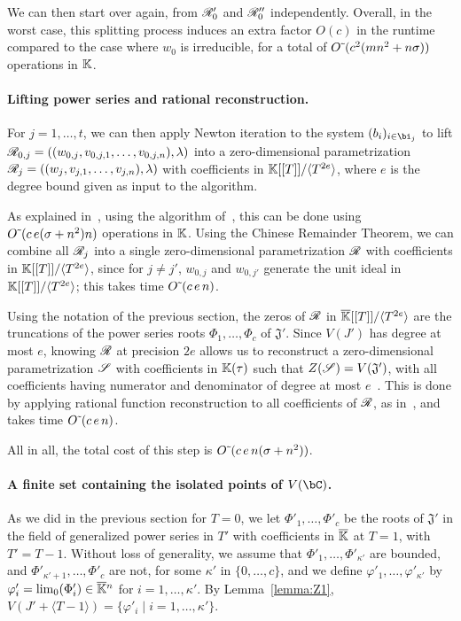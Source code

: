 \documentclass[12pt]{article}
\begin{document}
We can then start over again, from $\mathscr{R}'_0$ and $\mathscr{R}''_0$
independently. Overall, in the worst case, this splitting process
induces an extra factor $O(c)$ in the runtime compared to the case
where $w_0$ is irreducible, for a total of ${O}{\,\tilde{ }\,}( c^2 (mn^2 + n\sigma) )$
operations in $\mathbb{K}$.

\paragraph{Lifting power series and rational reconstruction.}
For $j=1,\dots,t$, we can then apply Newton iteration to the system
$(b_i)_{i \in \bi_j}$ to lift
$\mathscr{R}_{0,j}=((w_{0,j},v_{0,j,1},\dots,v_{0,j,n}),\lambda)$ into a
zero-dimensional parametrization
$\mathscr{R}_{j}=((w_{j},v_{j,1},\dots,v_{j,n}),\lambda)$ with coefficients
in $\mathbb{K}[[T]]/\langle T^{2e}\rangle$, where $e$ is the degree bound given
as input to the algorithm.

As explained in~\cite[Section~2.2]{SaSc16}, using the algorithm
of~\cite{GiLeSa01}, this can be done using ${O}{\,\tilde{ }\,}(c\,e (\sigma+n^2)n)$
operations in $\mathbb{K}$.  Using the Chinese Remainder Theorem, we can
combine all $\mathscr{R}_{j}$ into a single zero-dimensional parametrization
$\mathscr{R}$ with coefficients in $\mathbb{K}[[T]]/\langle T^{2e}\rangle$, since
for $j\ne j'$, $w_{0,j}$ and $w_{0,j'}$ generate the unit ideal in
$\mathbb{K}[[T]]/\langle T^{2e}\rangle$; this takes time 
${O}{\,\tilde{ }\,}(c\,e\,n)$.

Using the notation of the previous section, the zeros of $\mathscr{R}$ in
$\overline{\mathbb{K}}[[T]]/\langle T^{2e}\rangle$ are the truncations of the power
series roots $\Phi_1,\dots,\Phi_c$ of $\mathfrak{J}'$. Since $V(J')$ has
degree at most $e$, knowing $\mathscr{R}$ at precision $2e$ allows us to
reconstruct a zero-dimensional parametrization $\mathscr{S}$ with
coefficients in $\mathbb{K}(\tau)$ such that $Z(\mathscr{S})=V(\mathfrak{J}')$,
with all coefficients having numerator and denominator of degree at
most $e$~\cite[Theorem~1]{Schost03}.  This is done by applying
rational function reconstruction to all coefficients of $\mathscr{R}$, as
in~\cite{Schost03}, and takes time ${O}{\,\tilde{ }\,}(c\,e\,n)$.

All in all, the total cost of this step is ${O}{\,\tilde{ }\,}(c\,e\,n (\sigma+n^2))$.

\paragraph{A finite set containing the isolated points of $V(\bC)$.}
As we did in the previous section for $T=0$, we let
$\Phi'_1,\dots,\Phi'_c$ be the roots of $\mathfrak{J}'$ in the field
of generalized power series in $T'$ with coefficients in $\overline{\mathbb{K}}$ at
$T=1$, with $T'=T-1$. Without loss of generality, we assume that
$\Phi'_1,\dots,\Phi'_{\kappa'}$ are bounded, and
$\Phi'_{\kappa'+1},\dots,\Phi'_c$ are not, for some $\kappa'$ in
$\{0,\dots,c\}$, and we define $\varphi'_1,\dots,\varphi'_{\kappa'}$
by $\varphi'_i=\lim_0(\Phi'_i)\in\overline{\mathbb{K}}{}^n$ for $i=1,\dots,\kappa'$.
By Lemma~\ref{lemma:Z1},
$V(J' + \langle T-1\rangle) = \{ \varphi'_i \mid i=1,\dots,\kappa'\}$.
\end{document}
